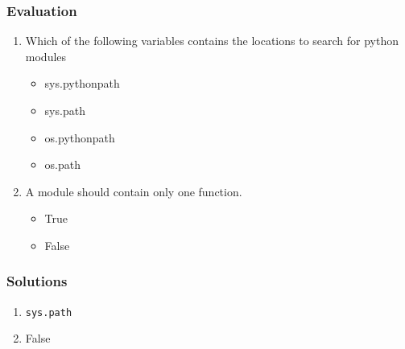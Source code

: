 \documentclass[17pt]{beamer}
\newcounter{saveenumi}
\newcommand{\seti}{\setcounter{saveenumi}{\value{enumi}}}
\begin{document}
\begin{frame}
\frametitle{Evaluation}
\label{sec-7}

\begin{enumerate}
\item Which of the following variables contains the locations to search for
   python modules\pause
	\begin{itemize}
	\item sys.pythonpath
	\item sys.path
	\item os.pythonpath
	\item os.path
	\end{itemize}\pause
\vspace{8pt}
\item A module should contain only one function.
\begin{itemize}
\item True
\item False
\end{itemize}
\seti
\end{enumerate}
\end{frame}

\begin{frame}
\frametitle{Solutions}
\label{sec-9}

\begin{enumerate}
\item \texttt{sys.path}\pause
\vspace{12pt}
\item False
\end{enumerate}
\end{frame}
\end{document}
